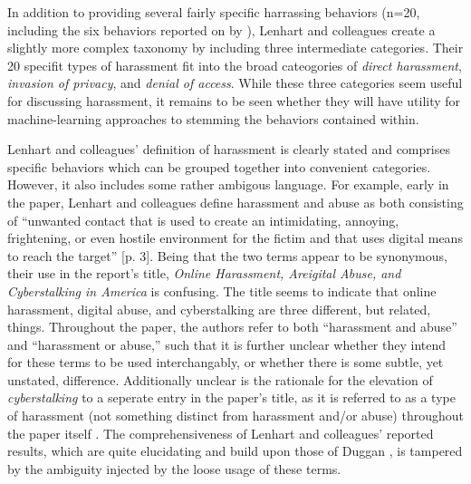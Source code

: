 \documentclass{sigchi}
\begin{document}
In addition to providing several fairly specific harrassing behaviors (n=20, including the six behaviors reported on by \cite{Duggan2014Online}), Lenhart and colleagues \cite{Lenhart2016Online} create a slightly more complex taxonomy by including three intermediate categories.  Their 20 specifit types of harassment fit into the broad cateogories of \textit{direct harassment}, \textit{invasion of privacy}, and \textit{denial of access}.  While these three categories seem useful for discussing harassment, it remains to be seen whether they will have utility for machine-learning approaches to stemming the behaviors contained within.

Lenhart and colleagues' \cite{Lenhart2016Online} definition of harassment is clearly stated and comprises specific behaviors which can be grouped together into convenient categories.  However, it also includes some rather ambigous language.  For example, early in the paper, Lenhart and colleagues define harassment and abuse as both consisting of ``unwanted contact that is used to create an intimidating, annoying, frightening, or even hostile environment for the fictim and that uses digital means to reach the target'' [p. 3].  Being that the two terms appear to be synonymous, their use in the report's title, \textit{Online Harassment, Areigital Abuse, and Cyberstalking in America} is confusing.  The title seems to indicate that online harassment, digital abuse, and cyberstalking are three different, but related, things.  Throughout the paper, the authors refer to both ``harassment and abuse'' and ``harassment or abuse,'' such that it is further unclear whether they intend for these terms to be used interchangably, or whether there is some subtle, yet unstated, difference.  Additionally unclear is the rationale for the elevation of \textit{cyberstalking} to a seperate entry in the paper's title, as it is referred to as a type of harassment (not something distinct from harassment and/or abuse) throughout the paper itself \footnotemark[1].  The comprehensiveness of Lenhart and colleagues' reported results, which are quite elucidating and build upon those of Duggan \cite{Duggan2014Online}, is tampered by the ambiguity injected by the loose usage of these terms.

\end{document}
